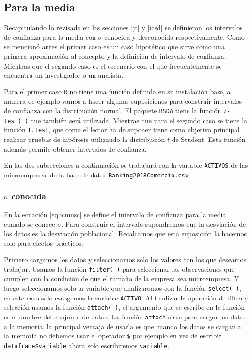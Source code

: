 \documentclass[letterpaper,]{book}
\begin{document}
\hypertarget{para-la-media}{%
\subsection{Para la media}\label{para-la-media}}

Recapitulando lo revisado en las secciones \ref{jt} y \ref{icsd} se definieron los intervalos de confianza para la media con \(\sigma\) conocida y desconocida respectivamente. Como se mencionó antes el primer caso es un caso hipotético que sirve como una primera aproximación al concepto y la definición de intervalo de confianza. Mientras que el segundo caso es el escenario con el que frecuentemente se encuentra un investigador o un analista.

Para el primer caso \texttt{R} no tiene una función definida en su instalación base, a manera de ejemplo vamos a hacer algunas suposiciones para construir intervalos de confianza con la distribución normal. El paquete \texttt{BSDA} tiene la función \texttt{z-test(\ )} que también será utilizada. Mientras que para el segundo caso se tiene la función \texttt{t.test}, que como el lector ha de suponer tiene como objetivo principal realizar pruebas de hipóresis utilizando la distribución \(t\) de Student. Esta función además permite obtener intervalos de confianza.

En las dos subsecciones a continuación se trabajará con la variable \texttt{ACTIVOS} de las microempresas de la base de datos \texttt{Ranking2018Comercio.csv}

\hypertarget{musc}{%
\subsubsection{\texorpdfstring{\(\sigma\) conocida}{\textbackslash{}sigma conocida}}\label{musc}}

En la ecuación \eqref{eq:icmusc} se define el intervalo de confianza para la media cuando se conoce \(\sigma\). Para construir el intervalo supondremos que la desviación de los datos es la desviación poblacional. Recalcamos que esta suposición la hacemos solo para efectos prácticos.

Primero cargamos los datos y seleccionamos solo los valores con los que deseamos trabajar. Usamos la función \texttt{filter(\ )} para seleccionar las observaciones que cumplen con la condición de que el tamaño de la empresa sea microempresa. Y luego seleccionamos solo la variable que analizaremos con la función \texttt{select(\ )}, en este caso solo escogemos la variable \texttt{ACTIVO}. Al finalizar la operación de filtro y selección usamos la función \texttt{attach(\ )}, el argumento que se escribe en la función es el nombre del conjunto de datos. La función \texttt{attach} sirve para cargar los datos a la memoria, la principal ventaja de usarla es que cuando los datos se cargan a la memoria no debemos usar el operador \texttt{\$} por ejemplo en vez de escribir \texttt{dataframe\$variable} ahora solo escribiremos \texttt{variable}.
\end{document}

